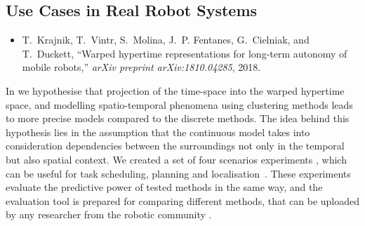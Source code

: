 \subsection{Use Cases in Real Robot Systems}

\begin{itemize}
    \item T.~Krajnik, T.~Vintr, S.~Molina, J.~P. Fentanes, G.~Cielniak, and T.~Duckett, ``Warped hypertime representations for long-term autonomy of mobile robots,'' \emph{arXiv preprint arXiv:1810.04285}, 2018.
\end{itemize}

In \cite{krajnik2018warped} we hypothesise that projection of the time-space into the warped hypertime space, and modelling spatio-temporal phenomena using clustering methods leads to more precise models compared to the discrete methods.
The idea behind this hypothesis lies in the assumption that the continuous model takes into consideration dependencies between
 the surroundings not only in the temporal \cite{tipaldi2013lifelong,rosen2016towards,kucner2013conditional,krajnik2017fremen} but also spatial context.
We created a set of four scenarios experiments \cite{krajnik2017towards}, which can be useful for task scheduling, planning and localisation~\cite{mudrova2015integrated}.
These experiments evaluate the predictive power of tested methods in the same way, and the evaluation tool is prepared for
 comparing different methods, that can be uploaded by any researcher from the robotic community \cite{krajnik2017towards}.

